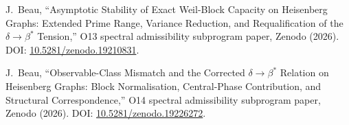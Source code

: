 J.~Beau,
``Asymptotic Stability of Exact Weil-Block Capacity on Heisenberg Graphs: Extended Prime Range, Variance Reduction,
and Requalification of the \(\delta \to \beta^*\) Tension,''
O13 spectral admissibility subprogram paper, Zenodo (2026).
DOI: \href{https://doi.org/10.5281/zenodo.19210831}{10.5281/zenodo.19210831}.

J.~Beau,
``Observable-Class Mismatch and the Corrected \(\delta \to \beta^*\) Relation on Heisenberg Graphs:
Block Normalisation, Central-Phase Contribution,
and Structural Correspondence,''
O14 spectral admissibility subprogram paper, Zenodo (2026).
DOI: \href{https://doi.org/10.5281/zenodo.19226272}{10.5281/zenodo.19226272}.

